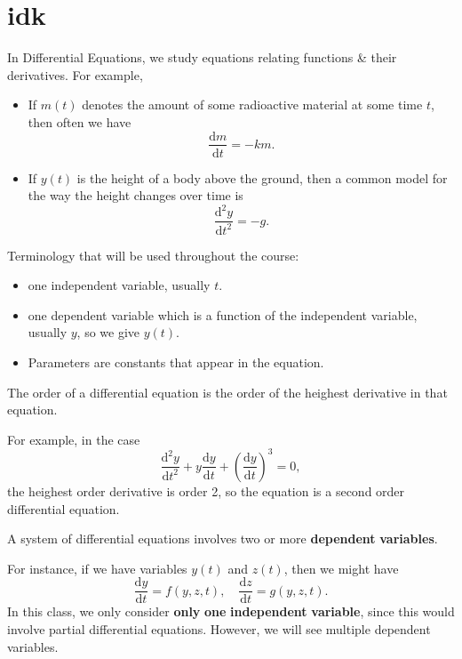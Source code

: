 \chapter{idk}
In Differential Equations, we study equations relating functions \& their derivatives. For example,
\begin{itemize}
	\item If $m(t)$ denotes the amount of some radioactive material at some time $t$, then often we have
		\[
			\frac{\mathrm{d}m}{\mathrm{d}t} =-km
		.\]
	\item If $y(t)$ is the height of a body above the ground, then a common model for the way the height changes over time is
		\[
			\frac{\mathrm{d} ^2 y}{\mathrm{d} t^2}=-g
		.\]
\end{itemize}

\begin{notation}
	Terminology that will be used throughout the course:
	\begin{itemize}
		\item one independent variable, usually $t$.
		\item one dependent variable which is a function of the independent variable, usually $y$, so we give $y(t)$.
		\item Parameters are constants that appear in the equation.
	\end{itemize}
\end{notation}

\begin{definition}\label{dfn:1}
	The order of a differential equation is the order of the heighest derivative in that equation.
\end{definition}

For example, in the case
\[
	\frac{\mathrm{d}^2y}{\mathrm{d}t^2} +y \frac{\mathrm{d}y}{\mathrm{d}t} +\left( \frac{\mathrm{d}y}{\mathrm{d}t}  \right)^3 = 0 
,\]
the heighest order derivative is order 2, so the equation is a second order differential equation.

\begin{definition}\label{dfn:2}
	A system of differential equations involves two or more \textbf{dependent} \textbf{variables}.
\end{definition}
For instance, if we have variables $y(t)$ and $z(t)$, then we might have
\[
	\frac{\mathrm{d}y}{\mathrm{d}t} =f(y,z,t),\quad \frac{\mathrm{d}z}{\mathrm{d}t} =g(y,z,t)
.\]
In this class, we only consider \textbf{only} \textbf{one} \textbf{independent} \textbf{variable}, since this would involve partial differential equations. However, we will see multiple dependent variables.

